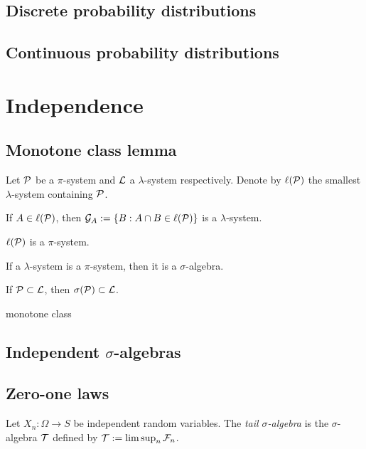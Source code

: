 \documentclass{../note}
\begin{document}
\section{Discrete probability distributions}

\section{Continuous probability distributions}









\chapter{Independence}


\section{Monotone class lemma}

\begin{prb}
Let $\mathcal{P}$ be a $\pi$-system and $\mathcal{L}$ a $\lambda$-system respectively.
Denote by $\ell(\mathcal{P})$ the smallest $\lambda$-system containing $\mathcal{P}$.
\begin{parts}
\item If $A\in\ell(\mathcal{P})$, then $\mathcal{G}_A:=\{B:A\cap B\in\ell(\mathcal{P})\}$ is a $\lambda$-system.
\item $\ell(\mathcal{P})$ is a $\pi$-system.
\item If a $\lambda$-system is a $\pi$-system, then it is a $\sigma$-algebra.
\item If $\mathcal{P}\subset\mathcal{L}$, then $\sigma(\mathcal{P})\subset\mathcal{L}$.
\end{parts}
\end{prb}

monotone class


\section{Independent $\sigma$-algebras}




\section{Zero-one laws}

\begin{prb}
Let $X_n:\Omega\to S$ be independent random variables.
The \emph{tail $\sigma$-algebra} is the $\sigma$-algebra $\mathcal{T}$ defined by $\mathcal{T}:=\limsup_n\mathcal{F}_n$.
\end{prb}
\end{document}
